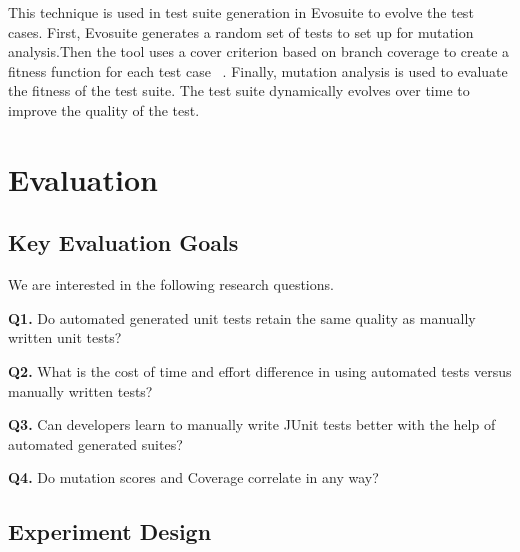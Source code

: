 \documentclass[conference]{IEEEtran}
\begin{document}
This technique is used in test suite generation in Evosuite to evolve the test cases. First, Evosuite generates a random set of tests to set up for mutation analysis.Then the tool uses a cover criterion based on branch coverage to create a fitness function for each test case ~\cite{Whole_Test_Suite_Generation:Fraser}. Finally, mutation analysis is used to evaluate the fitness of the test suite. The test suite dynamically evolves over time to improve the quality of the test. 

\section{Evaluation}
\label{sec:evaluation}

\subsection{Key Evaluation Goals}

We are interested in the following research questions.

\textbf{Q1.} Do automated generated unit tests retain the same quality as manually written unit tests?

\textbf{Q2.} What is the cost of time and effort difference in using automated tests versus manually written tests?

\textbf{Q3.} Can developers learn to manually write JUnit tests better with the help of automated generated suites?

\textbf{Q4.} Do mutation scores and Coverage correlate in any way?

\subsection{Experiment Design}
\end{document}

